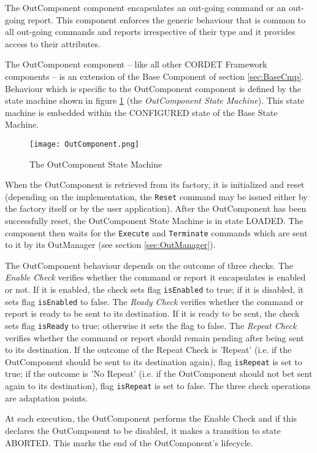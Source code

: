 The OutComponent component encapsulates an out-going command or an out-going report. This component enforces the generic behaviour that is common to all out-going commands and reports irrespective of their type and it provides access to their attributes.

The OutComponent component – like all other CORDET Framework components – is an extension of the Base Component of section \ref{sec:BaseCmp}. Behaviour which is specific to the OutComponent component is defined by the state machine shown in figure \ref{fig:OutComponent} (the \textit{OutComponent State Machine}). This state machine is embedded within the CONFIGURED state of the Base State Machine. 

\begin{figure}[h]
 \centering
 \texttt{[image: OutComponent.png]}
 \caption{The OutComponent State Machine}
 \label{fig:OutComponent}
\end{figure}

When the OutComponent is retrieved from its factory, it is initialized and reset (depending on the implementation, the \texttt{Reset} command may be issued either by the factory itself or by the user application). After the OutComponent has been successfully reset, the OutComponent State Machine is in state LOADED. The component then waits for the \texttt{Execute} and \texttt{Terminate} commands which are sent to it by its OutManager (see section \ref{sec:OutManager}). 

The OutComponent behaviour depends on the outcome of three checks. The \textit{Enable Check} verifies whether the command or report it encapsulates is enabled or not. If it is enabled, the check sets flag \texttt{isEnabled} to true; if it is disabled, it sets flag \texttt{isEnabled} to false. The \textit{Ready Check} verifies whether the command or report is ready to be sent to its destination. If it is ready to be sent, the check sets flag \texttt{isReady} to true; otherwise it sets the flag to false. The \textit{Repeat Check} verifies whether the command or report should remain pending after being sent to its destination. If the outcome of the Repeat Check is 'Repeat' (i.e. if the OutComponent should be sent to its destination again), flag \texttt{isRepeat} is set to true; if the outcome is 'No Repeat' (i.e. if the OutComponent should not bet sent again to its destination), flag \texttt{isRepeat} is set to false. The three check operations are adaptation points.

At each execution, the OutComponent performs the Enable Check and if this declares the OutComponent to be disabled, it makes a transition to state ABORTED. This marks the end of the OutComponent's lifecycle.

